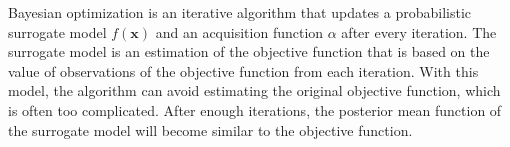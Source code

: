 

Bayesian optimization is an iterative algorithm that updates a probabilistic surrogate model $f(\mathbf{x})$ and an acquisition function $\alpha$ after every iteration. The surrogate model is an estimation of the objective function that is based on the value of observations of the objective function from each iteration. With this model, the algorithm can avoid estimating the original objective function, which is often too complicated. After enough iterations, the posterior mean function of the surrogate model will become similar to the objective function.

